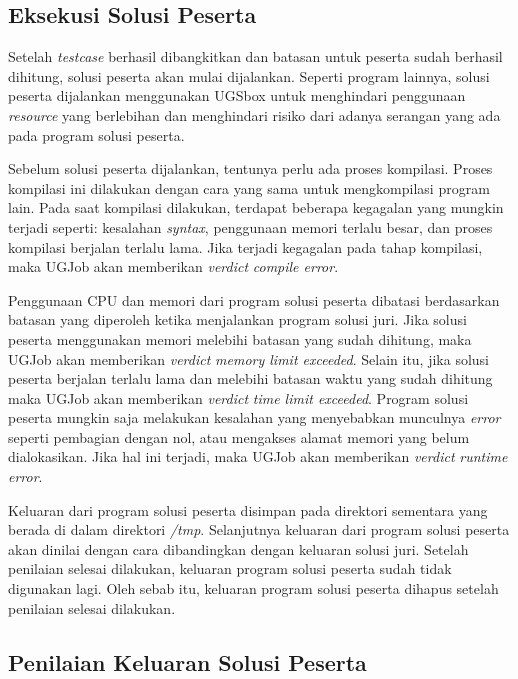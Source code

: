 \subsection{Eksekusi Solusi Peserta}

\par Setelah \textit{testcase} berhasil dibangkitkan dan batasan untuk peserta sudah berhasil dihitung, solusi peserta akan mulai dijalankan. Seperti program lainnya, solusi peserta dijalankan menggunakan UGSbox untuk menghindari penggunaan \textit{resource} yang berlebihan dan menghindari risiko dari adanya serangan yang ada pada program solusi peserta.

\par Sebelum solusi peserta dijalankan, tentunya perlu ada proses kompilasi. Proses kompilasi ini dilakukan dengan cara yang sama untuk mengkompilasi program lain. Pada saat kompilasi dilakukan, terdapat beberapa kegagalan yang mungkin terjadi seperti: kesalahan \textit{syntax}, penggunaan memori terlalu besar, dan proses kompilasi berjalan terlalu lama. Jika terjadi kegagalan pada tahap kompilasi, maka UGJob akan memberikan \textit{verdict} \textit{compile error}.

\par Penggunaan CPU dan memori dari program solusi peserta dibatasi berdasarkan batasan yang diperoleh ketika menjalankan program solusi juri. Jika solusi peserta menggunakan memori melebihi batasan yang sudah dihitung, maka UGJob akan memberikan \textit{verdict} \textit{memory limit exceeded}. Selain itu, jika solusi peserta berjalan terlalu lama dan melebihi batasan waktu yang sudah dihitung maka UGJob akan memberikan \textit{verdict} \textit{time limit exceeded}. Program solusi peserta mungkin saja melakukan kesalahan yang menyebabkan munculnya \textit{error} seperti pembagian dengan nol, atau mengakses alamat memori yang belum dialokasikan. Jika hal ini terjadi, maka UGJob akan memberikan \textit{verdict} \textit{runtime error}.

\par Keluaran dari program solusi peserta disimpan pada direktori sementara yang berada di dalam direktori \textit{/tmp}. Selanjutnya keluaran dari program solusi peserta akan dinilai dengan cara dibandingkan dengan keluaran solusi juri. Setelah penilaian selesai dilakukan, keluaran program solusi peserta sudah tidak digunakan lagi. Oleh sebab itu, keluaran program solusi peserta dihapus setelah penilaian selesai dilakukan.

\subsection{Penilaian Keluaran Solusi Peserta}

